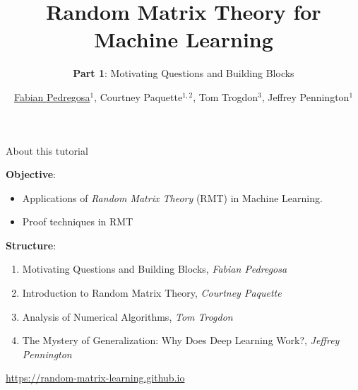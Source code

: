 \documentclass[10pt, aspectratio=169]{beamer}
\title{Random Matrix Theory for Machine Learning}
\subtitle{{\bfseries Part 1}: Motivating Questions and Building Blocks}
\date{}
\author{\underline{Fabian Pedregosa}$^1$, Courtney Paquette$^{1, 2}$, Tom Trogdon$^3$, Jeffrey Pennington$^1$}
\institute{
$^1$ Google Research\,, $^2$ McGill University\,, $^3$ University of Washington\\
\\
\url{https://random-matrix-learning.github.io}
}
\begin{document}
\maketitle

\begin{frame}{About this tutorial}

{\bfseries Objective}:
\begin{itemize}
    \item Applications of \emph{Random Matrix Theory} (RMT) in Machine Learning.
    \item Proof techniques in RMT
\end{itemize}

\pause
{\bfseries Structure}:
\begin{enumerate}
    \item Motivating Questions and Building Blocks, \emph{Fabian Pedregosa}
    \item Introduction to Random Matrix Theory, \emph{Courtney Paquette}
    \item Analysis of Numerical Algorithms, \emph{Tom Trogdon}
    \item The Mystery of Generalization: Why Does Deep Learning Work?, \emph{Jeffrey Pennington}
\end{enumerate}

\begin{center}
    \url{https://random-matrix-learning.github.io}
\end{center}

\end{frame}



\end{document}
